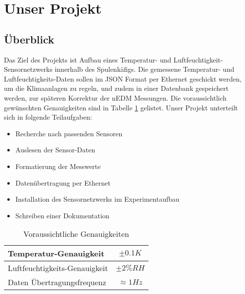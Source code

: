 \section*{Unser Projekt}
\subsection*{Überblick}
Das Ziel des Projekts ist Aufbau eines Temperatur- und Luftfeuchtigkeit-
Sensornetzwerks innerhalb des Spulenkäfigs. Die gemessene Temperatur- und 
Luft\-feuchtig\-keits-Daten sollen im JSON Format per Ethernet geschickt werden, um 
die Klimaanlagen zu regeln, und zudem in einer 
Datenbank gespeichert werden, zur späteren Korrektur der nEDM Messungen. 
Die voraus\-sichtlich gewünschten Genauig\-keiten sind in Tabelle \ref{tab:genauigkeit} gelistet.
Unser Projekt unterteilt sich in folgende Teilaufgaben:
\begin{itemize}
\item Recherche nach passenden Sensoren 
\item Auslesen der Sensor-Daten
\item Formatierung der Messwerte
\item Datenübertragung per Ethernet
\item Installation des Sensornetzwerks im Experimentaufbau
\item Schreiben einer Dokumentation
\end{itemize}
\begin{table}[h]
  \centering
  \begin{tabular}{|l|c|}
    \hline
    Temperatur-Genauigkeit & $\pm0.1 K$
    \\ \hline
    Luftfeuchtigkeits-Genauigkeit & $\pm 2\%RH$
    \\ \hline
    Daten Übertragungsfrequenz & $\approx 1Hz$
    \\ \hline
  \end{tabular}
  \caption{Voraussichtliche Genauigkeiten}
  \label{tab:genauigkeit}
\end{table}
